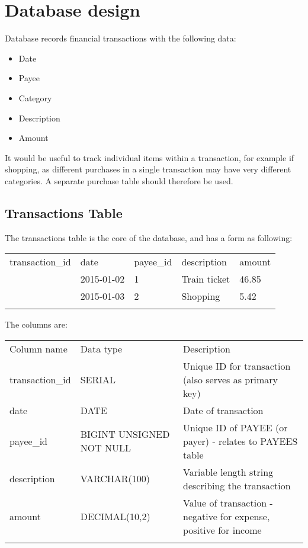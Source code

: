 \documentclass[]{article}
\begin{document}
\section{Database design}\label{database-design}

Database records financial transactions with the following data:

\begin{itemize}
\itemsep1pt\parskip0pt
\item
  Date
\item
  Payee
\item
  Category
\item
  Description
\item
  Amount
\end{itemize}

It would be useful to track individual items within a transaction, for
example if shopping, as different purchases in a single transaction may
have very different categories. A separate purchase table should
therefore be used.

\subsection{Transactions Table}\label{transactions-table}

The transactions table is the core of the database, and has a form as
following:

\begin{longtable}[c]{@{}lllll@{}}
\toprule\addlinespace
transaction\_id & date & payee\_id & description & amount
\\\addlinespace
\midrule\endhead
1 & 2015-01-02 & 1 & Train ticket & 46.85
\\\addlinespace
2 & 2015-01-03 & 2 & Shopping & 5.42
\\\addlinespace
\bottomrule
\end{longtable}

The columns are:

\begin{longtable}[c]{@{}lll@{}}
\toprule\addlinespace
Column name & Data type & Description
\\\addlinespace
\midrule\endhead
transaction\_id & SERIAL & Unique ID for transaction (also serves as
primary key)
\\\addlinespace
date & DATE & Date of transaction
\\\addlinespace
payee\_id & BIGINT UNSIGNED NOT NULL & Unique ID of PAYEE (or payer) -
relates to PAYEES table
\\\addlinespace
description & VARCHAR(100) & Variable length string describing the
transaction
\\\addlinespace
amount & DECIMAL(10,2) & Value of transaction - negative for expense,
positive for income
\\\addlinespace
\bottomrule
\end{longtable}
\end{document}

